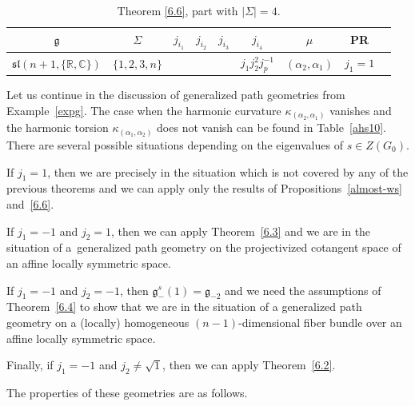 \documentclass[10pt,a4paper]{amsart}
\newcommand{\Si}{\Sigma}
\newcommand{\fg}{\mathfrak g}
\numberwithin{equation}{section}
\begin{document}
\begin{table}[th!]\centering\caption{Theorem \ref{6.6}, part with $|\Si|=4$.}\label{ahs12}\vspace{1mm}

\begin{tabular}{|c|c|c|c|c|c|c|c|c|}
\hline
$\fg$ & $\Sigma$ & $j_{i_1}$& $j_{i_2}$& $j_{i_3}$& $j_{i_4}$& $\mu$& PR \\
\hline
\hline
$\mathfrak{sl}(n+1,\{\mathbb{R, C}\})$ & $\{1,2,3,n\}$&&&&$j_1j_2^2j_p^{-1}$&$(\alpha_2,\alpha_1)$&$j_1=1$\\
\hline
\end{tabular}
\end{table}

\begin{Example}
Let us continue in the discussion of generalized path geometries from Examp\-le~\ref{expg}. The case when the harmonic curvature $\kappa_{(\alpha_2,\alpha_1)}$ vanishes and the harmonic torsion $\kappa_{(\alpha_1,\alpha_2)}$ does not vanish can be found in Table~\ref{ahs10}. There are several possible situations depending on the eigenvalues of $s\in Z(G_0)$.

If $j_1=1$, then we are precisely in the situation which is not covered by any of the previous theorems and we can apply only the results of Propositions~\ref{almost-ws} and~\ref{6.6}.

If $j_1=-1$ and $j_2=1$, then we can apply Theorem~\ref{6.3} and we are in the situation of a~generalized path geometry on the projectivized cotangent space of an af\/f\/ine locally symmetric space.

If $j_1=-1$ and $j_2=-1$, then $\fg_-^s(1)=\fg_{-2}$ and we need the assumptions of Theorem~\ref{6.4} to show that we are in the situation of a generalized path geometry on a (locally) homogeneous $(n-1)$-dimensional f\/iber bundle over an af\/f\/ine locally symmetric space.

Finally, if $j_1=-1$ and $j_2\neq \sqrt{1}$, then we can apply Theorem~\ref{6.2}.
\end{Example}

The properties of these geometries are as follows.
\end{document}
